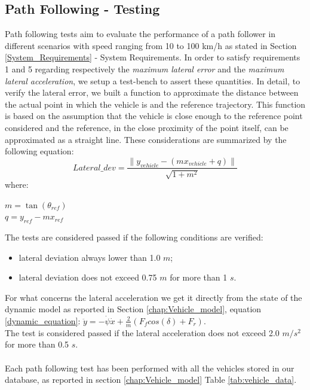\subsection{Path Following - Testing} \label{subsection:path_following_testing}
Path following tests aim to evaluate the performance of a path follower in different scenarios with speed ranging from 10 to 100 km/h as stated in Section \ref{System_Requirements} - System Requirements.
In order to satisfy requirements 1 and 5 regarding respectively the \textit{maximum lateral error} and the \textit{maximum lateral acceleration}, we setup a test-bench to assert these quantities. In detail, to verify the lateral error, we built a function to approximate the distance between the actual point in which the vehicle is and the reference trajectory. This function is based on the assumption that the vehicle is close enough to the reference point considered and the reference, in the close proximity of the point itself, can be approximated as a straight line. These considerations are summarized by the following equation:
\begin{equation}
    Lateral\_dev = \frac{\|y_{vehicle} - (mx_{vehicle} + q)\|}{\sqrt{1 + m^2}} \label{eq:lateral_dev}
\end{equation}
where:\\
\begin{center}
 $   m = \tan(\theta_{ref}) $\\ 
 $  q = y_{ref}-mx_{ref}$
\end{center}
\vspace{10pt}
The tests are considered passed if the following conditions are verified:
\begin{itemize}
    \item lateral deviation always lower than 1.0 $m$;
    \item lateral deviation does not exceed 0.75 $m$ for more than 1 $s$.
\end{itemize}
\vspace{10pt}
For what concerns the lateral acceleration we get it directly from the state of the dynamic model as reported in Section \ref{chap:Vehicle_model}, equation \ref{dynamic_equation}: $\ddot{y} = -\dot{\psi}\dot{x} + \frac{2}{m}\left(F_fcos(\delta) + F_r\right)$.\\
The test is considered passed if the lateral acceleration does not exceed 2.0 $m/s^2$ for more than 0.5 $s$.\\ \\
Each path following test has been performed with all the vehicles stored in our database, as reported in section \ref{chap:Vehicle_model} Table \ref{tab:vehicle_data}.

